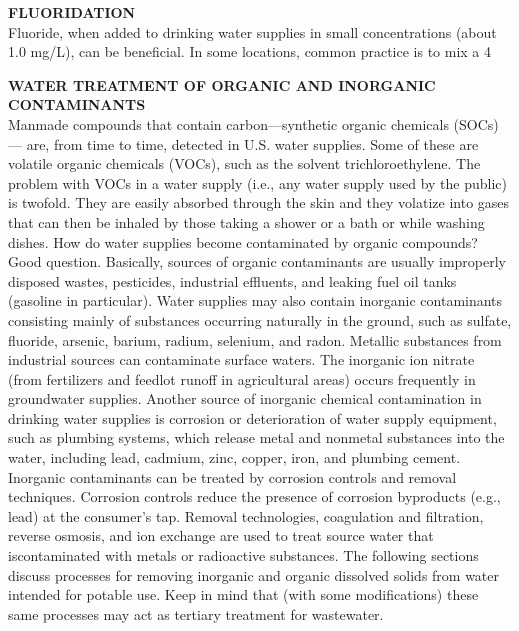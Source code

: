 \textbf{FLUORIDATION}\\
Fluoride, when added to drinking water supplies in small concentrations (about 1.0 mg/L), can be beneficial. In some locations, common practice is to mix a 4%

\textbf{WATER TREATMENT OF ORGANIC AND INORGANIC CONTAMINANTS}\\
Manmade compounds that contain carbon—synthetic organic chemicals (SOCs)— are, from time to time, detected in U.S. water supplies. Some of these are volatile organic chemicals (VOCs), such as the solvent trichloroethylene. The problem with VOCs in a water supply (i.e., any water supply used by the public) is twofold. They are easily absorbed through the skin and they volatize into gases that can then be inhaled by those taking a shower or a bath or while washing dishes. How do water supplies become contaminated by organic compounds? Good question. Basically, sources of organic contaminants are usually improperly disposed wastes, pesticides, industrial effluents, and leaking fuel oil tanks (gasoline in particular).
Water supplies may also contain inorganic contaminants consisting mainly of substances occurring naturally in the ground, such as sulfate, fluoride, arsenic, barium, radium, selenium, and radon. Metallic substances from industrial sources can contaminate surface waters. The inorganic ion nitrate (from fertilizers and feedlot runoff in agricultural areas) occurs frequently in groundwater supplies. Another source of inorganic chemical contamination in drinking water supplies is corrosion or deterioration of water supply equipment, such as plumbing systems, which release metal and nonmetal substances into the water, including lead, cadmium, zinc, copper, iron, and plumbing cement. Inorganic contaminants can be treated by corrosion controls and removal techniques. Corrosion controls reduce the presence of corrosion byproducts (e.g., lead) at the consumer’s tap. Removal technologies, coagulation and filtration, reverse osmosis, and ion exchange are used to treat source water that iscontaminated with metals or radioactive substances. The following sections discuss processes for removing inorganic and organic dissolved solids from water intended for potable use. Keep in mind that (with some modifications) these same processes may act as tertiary treatment for wastewater.\\
 

